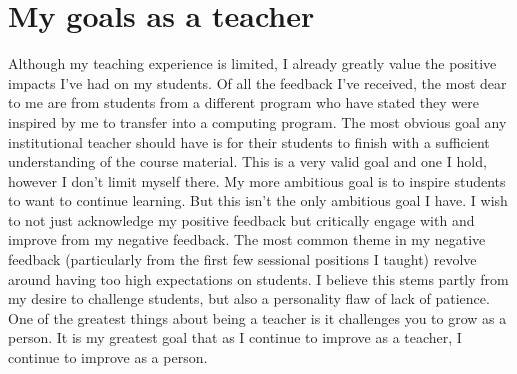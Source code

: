 \documentclass{article}
\begin{document}
\section{My goals as a teacher}
\label{sec:orga7ba031}

Although my teaching experience is limited, I already greatly value the
positive impacts I've had on my students. Of all the feedback I've received,
the most dear to me are from students from a different program who have stated
they were inspired by me to transfer into a computing program. The most
obvious goal any institutional teacher should have is for their students to
finish with a sufficient understanding of the course material. This is a very
valid goal and one I hold, however I don't limit myself there. My more
ambitious goal is to inspire students to want to continue learning. But this
isn't the only ambitious goal I have. I wish to not just acknowledge my
positive feedback but critically engage with and improve from my negative
feedback. The most common theme in my negative feedback (particularly from the
first few sessional positions I taught) revolve around having too high
expectations on students. I believe this stems partly from my desire to
challenge students, but also a personality flaw of lack of patience. One of
the greatest things about being a teacher is it challenges you to grow as a
person. It is my greatest goal that as I continue to improve as a teacher, I
continue to improve as a person.
\end{document}
